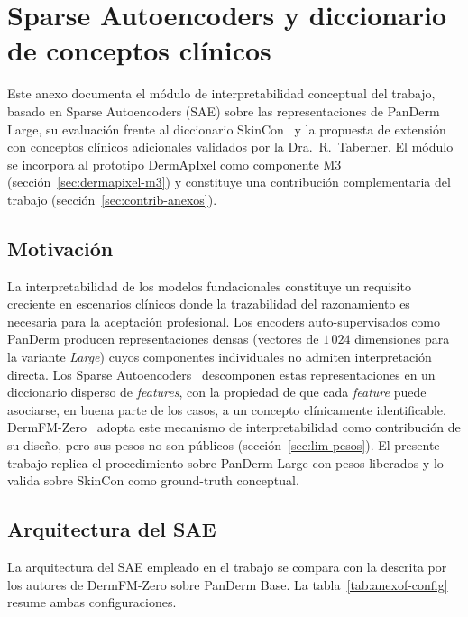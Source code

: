 
\chapter{Sparse Autoencoders y diccionario de conceptos clínicos}
\label{cap:anexof}

Este anexo documenta el módulo de interpretabilidad conceptual del
trabajo, basado en Sparse Autoencoders (SAE) sobre las
representaciones de PanDerm Large, su evaluación frente al
diccionario SkinCon~\cite{skincon} y la propuesta de extensión
con conceptos clínicos adicionales validados por la
Dra.~R.~Taberner. El módulo se incorpora al prototipo DermApIxel
como componente M3 (sección~\ref{sec:dermapixel-m3}) y constituye una
contribución complementaria del trabajo
(sección~\ref{sec:contrib-anexos}).

\section{Motivación}
\label{sec:anexof-motivacion}

La interpretabilidad de los modelos fundacionales constituye un
requisito creciente en escenarios clínicos donde la trazabilidad
del razonamiento es necesaria para la aceptación profesional. Los
encoders auto-supervisados como PanDerm producen representaciones
densas (vectores de $1\,024$ dimensiones para la variante
\emph{Large}) cuyos componentes individuales no admiten
interpretación directa. Los Sparse
Autoencoders~\cite{templeton2024} descomponen estas
representaciones en un diccionario disperso de \emph{features},
con la propiedad de que cada \emph{feature} puede asociarse, en
buena parte de los casos, a un concepto clínicamente
identificable. DermFM-Zero~\cite{dermfmzero2026} adopta este
mecanismo de interpretabilidad como contribución de su diseño,
pero sus pesos no son públicos (sección~\ref{sec:lim-pesos}). El
presente trabajo replica el procedimiento sobre PanDerm Large con
pesos liberados y lo valida sobre SkinCon como ground-truth
conceptual.

\section{Arquitectura del SAE}
\label{sec:anexof-arquitectura}

La arquitectura del SAE empleado en el trabajo se compara con la
descrita por los autores de DermFM-Zero sobre PanDerm Base. La
tabla~\ref{tab:anexof-config} resume ambas configuraciones.

